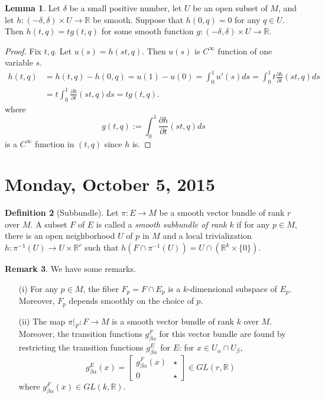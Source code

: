 \documentclass{amsart}
\numberwithin{equation}{section}
\newcommand{\bR}{\mathbb{R}}
\theoremstyle{definition}
\newtheorem{definition}{Definition} [section]
\newtheorem{remark}[definition]{Remark}
\theoremstyle{theorem}
\newtheorem{lemma}[definition]{Lemma}
\begin{document}
\begin{lemma}\label{h-hzero}
Let $\delta$ be a small positive number, let $U$ be an open subset of $M$, and let $h : (-\delta, \delta) \times U \to \mathbb{R}$ be smooth. Suppose that $h(0,q) = 0$ for any $q \in U$. Then $h(t,q) = t g(t,q)$ for some smooth function $g : (-\delta, \delta) \times U \to \mathbb{R}$.
\end{lemma}

\begin{proof}
Fix $t,q$. Let $u(s) = h(st, q)$. Then $u(s)$ is $C^\infty$ function of one variable $s$. 
\begin{align*}
h(t,q) &= h(t,q) - h(0,q) = u(1) - u(0) = \int_{0}^1 u'(s)ds = \int_0^1 t \frac{\partial h}{\partial t}(st,q)ds \\
&= t \int_0^1 \frac{\partial h}{\partial t}(st,q)ds = tg(t,q).
\end{align*}
where 
$$
g(t,q):= \int_0^1 \frac{\partial h}{\partial t}(st,q)ds
$$
is a $C^\infty$ function in $(t,q)$ since $h$ is.  
\end{proof}



\section{Monday, October 5, 2015}


\begin{definition}[Subbundle]
Let $\pi : E \to M$ be a smooth vector bundle of rank $r$ over $M$. A subset $F$ of $E$ is called a 
{\em smooth subbundle of rank $k$} if for any $p \in M$, there is an open neighborhood $U$ of $p$ in $M$ and a local trivialization  $h : \pi^{-1}(U) \to U \times \bR^r$ such that $h\left(F \cap \pi^{-1}(U)\right) = U \cap (\bR^k \times \{0\})$. 
\end{definition}

\begin{remark}
We have some remarks. 
\begin{enumerate}
\item[(i)] For any $p \in M$, the fiber $F_p = F \cap E_p$ is a $k$-dimensional subspace of $E_p$. Moreover, $F_p$ depends smoothly on the choice of $p$. 
\item[(ii)] The map $\pi|_F : F \to M$ is a smooth vector bundle of rank $k$ over $M$. Moreover, the transition functions
$g^F_{\beta\alpha}$  for this vector bundle are found by restricting the transition functions $g^E_{\beta\alpha}$ for $E$:
for $x\in U_\alpha\cap U_\beta$, 
$$
g_{\beta\alpha}^E(x) = \left [\begin{array}{cc} g_{\beta\alpha}^F(x) & \star \\ 0 & \star \end{array}\right]
\in GL(r,\bR)
$$ 
where $g_{\beta\alpha}^F(x)\in GL(k,\bR)$.
\end{enumerate}
\end{remark}
\end{document}
